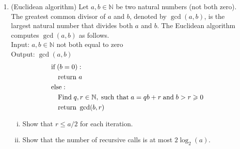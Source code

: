 \documentclass[11pt]{article}
\newcommand{\setN}{\mathbb{N}}
\renewcommand{\leq}{\leqslant}
\renewcommand{\geq}{\geqslant}
\begin{document}
\begin{enumerate}[1)]

\item (Euclidean algorithm) Let $a, b ∈ \setN$ be two natural numbers (not both zero). The greatest common divisor of $a$ and $b$, denoted by $\gcd(a, b)$, is the largest natural number that divides both $a$ and $b$. The Euclidean algorithm computes $\gcd(a, b)$ as follows.\\
Input: $a, b ∈ \setN$ not both equal to zero \\
Output: $\gcd(a, b)$\\
\begin{align*}
&\text{if}\;(b = 0):\\
&\quad\text{return }a\\
&\text{else}:\\
& \quad \text{Find}\;q,r\in \N, \;\text{such that}\; a=qb + r\;\text{and}\;b>r\geq 0\\
& \quad \text{return }\gcd(b, r)
\end{align*}
\begin{enumerate}[i)]
\item Show that $r\leq a/2$ for each iteration.
\item Show that the number of recursive calls is at most $2\log_2(a)$.
\end{enumerate}







\end{enumerate}
\end{document}
